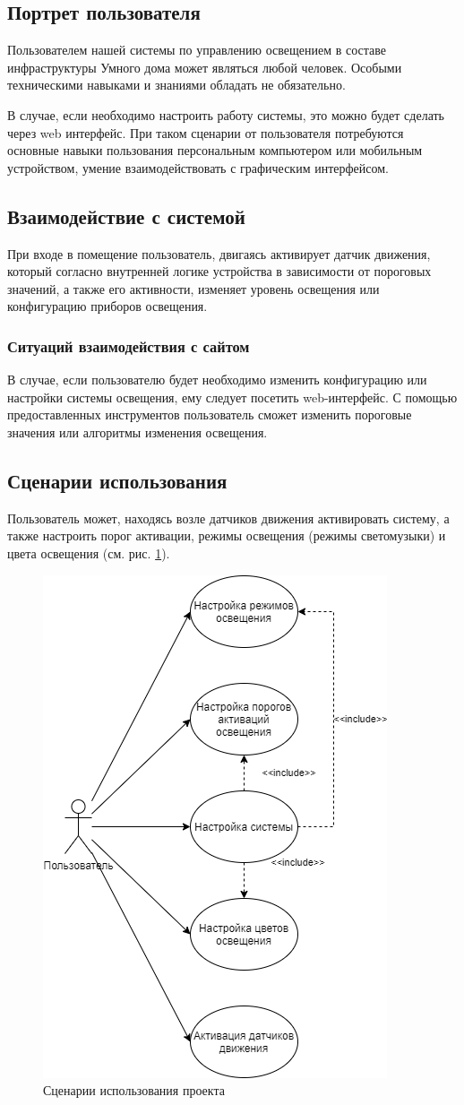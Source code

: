 \documentclass[a4paper,14pt]{extarticle}
\begin{document}
\subsection{Портрет пользователя}
Пользователем нашей системы по управлению освещением в составе инфраструктуры Умного дома может являться любой человек. Особыми техническими навыками и знаниями обладать не обязательно.

В случае, если необходимо настроить работу системы, это можно будет сделать через web интерфейс. При таком сценарии от пользователя потребуются основные навыки пользования персональным компьютером или мобильным устройством, умение взаимодействовать с графическим интерфейсом.
\subsection{Взаимодействие с системой}

При входе в помещение пользователь, двигаясь активирует датчик движения, который согласно внутренней логике устройства в зависимости от пороговых значений, а также его активности, изменяет уровень освещения или конфигурацию приборов освещения.

\subsubsection*{Ситуаций взаимодействия с сайтом}
В случае, если пользователю будет необходимо изменить конфигурацию или настройки системы освещения, ему следует посетить web-интерфейс. С помощью предоставленных инструментов пользователь сможет изменить пороговые значения или алгоритмы изменения освещения.

\subsection{Сценарии использования}
Пользователь может, находясь возле датчиков движения активировать систему, а также настроить порог активации, режимы освещения (режимы светомузыки) и цвета освещения (см. рис. \ref{fig:usecase}).

  \begin{figure}[htbp]
  	\centering
  	\includegraphics[width=0.5\linewidth]{images/usecase}
  	\caption{Сценарии использования проекта}
  	\label{fig:usecase}
  \end{figure}
\newpage
\end{document}
